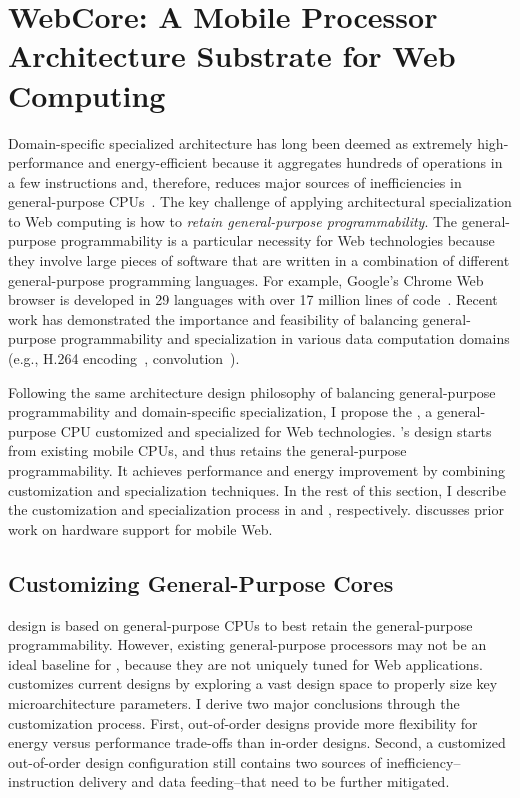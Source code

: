 
\chapter{WebCore: A Mobile Processor Architecture Substrate for Web Computing}
\label{sec:arch}

Domain-specific specialized architecture has long been deemed as extremely high-performance and energy-efficient because it aggregates hundreds of operations in a few instructions and, therefore, reduces major sources of inefficiencies in general-purpose CPUs~\cite{h264,soda,anysp}. The key challenge of applying architectural specialization to Web computing is how to \textit{retain general-purpose programmability}. The general-purpose programmability is a particular necessity for Web technologies because they involve large pieces of software that are written in a combination of different general-purpose programming languages. For example, Google's Chrome Web browser is developed in 29 languages with over 17 million lines of code~\cite{chromeloc}. Recent work has demonstrated the importance and feasibility of balancing general-purpose programmability and specialization in various data computation domains (e.g., H.264 encoding~\cite{h264}, convolution~\cite{ce}).

Following the same architecture design philosophy of balancing general-purpose programmability and domain-specific specialization, I propose the \webcore, a general-purpose CPU customized and specialized for Web technologies. \webcore's design starts from existing mobile CPUs, and thus retains the general-purpose programmability. It achieves performance and energy improvement by combining customization and specialization techniques. In the rest of this section, I describe the customization and specialization process in  and , respectively.  discusses prior work on hardware support for mobile Web.

\section{Customizing General-Purpose Cores}
\label{sec:arch:customization}

\webcore design is based on general-purpose CPUs to best retain the general-purpose programmability. However, existing general-purpose processors may not be an ideal baseline for \webcore, because they are not uniquely tuned for Web applications. \webcore customizes current designs by exploring a vast design space to properly size key microarchitecture parameters. I derive two major conclusions through the customization process. First, out-of-order designs provide more flexibility for energy versus performance trade-offs than in-order designs. Second, a customized out-of-order design configuration still contains two sources of inefficiency--instruction delivery and data feeding--that need to be further mitigated.

